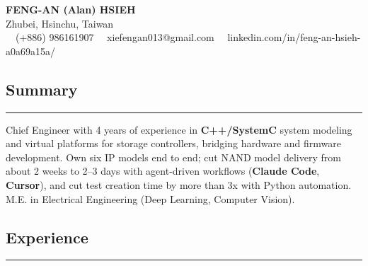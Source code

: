\documentclass[11pt,a4paper]{article}
\begin{document}
\begin{center}
	{\LARGE \textbf{FENG-AN (Alan) HSIEH}}\\
	Zhubei, Hsinchu, Taiwan
	\vspace{0.05cm}
	\\
	\raisebox{-0.2\height} {\Large \faPhoneSquare} \ \  (+886) 986161907 
    \raisebox{-0.2\height}{\Large \faEnvelopeSquare} \ \ xiefengan013@gmail.com %
    \raisebox{-0.2\height}{\Large \faLinkedinSquare} \ \ linkedin.com/in/feng-an-hsieh-a0a69a15a/
\end{center}

\subsection*{\Large Summary}
\hrule
\vspace{1em}

\begin{itemize}[leftmargin=1em,noitemsep]
	
    Chief Engineer with 4 years of experience in \textbf{C++/SystemC} system modeling and virtual platforms for storage controllers, bridging hardware and firmware development. Own six IP models end to end; cut NAND model delivery from about 2 weeks to 2--3 days with agent-driven workflows (\textbf{Claude Code}, \textbf{Cursor}), and cut test creation time by more than 3x with Python automation. M.E. in Electrical Engineering (Deep Learning, Computer Vision).
          
\end{itemize}
\subsection*{\Large Experience}
\hrule
\vspace{1em}
\end{document}
